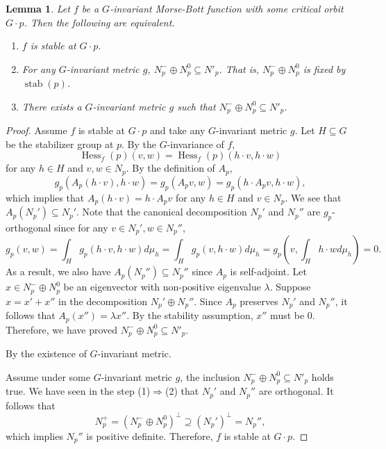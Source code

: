 \documentclass[11pt]{amsart}
\newtheorem{lemma}[theorem]{Lemma}
\theoremstyle{definition}
\numberwithin{equation}{subsection}
\DeclareMathOperator{\Hess}{Hess}
\DeclareMathOperator{\stab}{stab}
\begin{document}
\begin{lemma}\label{lem:stabledefinition}
    Let $f$ be a $G$-invariant Morse-Bott function with some critical orbit $G\cdot p$. Then the following are equivalent.
    \begin{enumerate}
        \item $f$ is stable at $G\cdot p$.
        \item For any $G$-invariant metric $g$, $N^{-}_{p}\oplus N_p^0 \subseteq N'_{p}$. That is, $N^{-}_{p}\oplus N_p^0$ is fixed by $\stab(p)$.
        \item There exists a $G$-invariant metric $g$ such that $N^{-}_{p}\oplus N_p^0 \subseteq N'_{p}$.
        
    \end{enumerate} 
\end{lemma}
\begin{proof}
    Assume $f$ is stable at $G\cdot p$ and take any $G$-invariant metric $g$. Let $H\subseteq G$ be the stabilizer group at $p$. By the $G$-invariance of $f$,\[\Hess_f(p)(v,w)=\Hess_f(p)(h\cdot v,h\cdot w)\]
    for any $h\in H$ and $v,w\in N_p$. By the definition of $A_p$,  \[g_p(A_p(h\cdot v),h\cdot w)=g_p(A_pv,w)=g_p(h\cdot A_pv,h\cdot w),\]which implies that $A_p(h\cdot v)=h\cdot A_pv$ for any $h\in H$ and $v\in N_p$. We see that $A_p(N_p')\subseteq N_p'$. Note that the canonical decomposition $N_p'$ and $N_p''$ are $g_p$-orthogonal since for any $v\in N_p',w\in N_p''$, \[g_p(v,w)=\int_Hg_p(h\cdot v,h\cdot w)d\mu_h=\int_Hg_p(v,h\cdot w)d\mu_h=g_p(v,\int_H h\cdot wd\mu_h)=0.\] As a result, we also have $A_p(N_p'')\subseteq N_p''$ since $A_p$ is self-adjoint. Let $x\in N_p^-\oplus N_p^0$ be an eigenvector with non-positive eigenvalue $\lambda$. Suppose $x=x'+x''$ in the decomposition $N_p'\oplus N_p''$. Since $A_p$ preserves $N_p'$ and $N_p''$, it follows that $A_p(x'')=\lambda x''$. By the stability assumption, $x''$ must be $0$. Therefore, we have proved $N^{-}_{p}\oplus N_p^0 \subseteq N'_{p}$.
    
    \medskip
    
     By the existence of $G$-invariant metric.
    \medskip
    
     Assume under some $G$-invariant metric $g$, the inclusion $N^{-}_{p}\oplus N_p^0 \subseteq N'_{p}$ holds true. We have seen in the step (1)$\Rightarrow$(2) that $N_p'$ and $N_p''$ are orthogonal. It follows that \[N_p^+=(N^{-}_{p}\oplus N_p^0 )^{\perp}\supseteq (N_p')^{\perp}=N_p'',\] which implies $N_p''$ is positive definite. Therefore, $f$ is stable at $G\cdot p$.
\end{proof}
\end{document}

